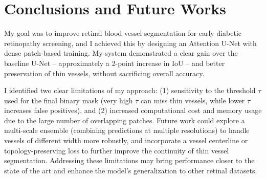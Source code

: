 \documentclass[11pt]{article}
\begin{document}
\section{Conclusions and Future Works}
My goal was to improve retinal blood vessel segmentation for early diabetic retinopathy screening, and I achieved this by designing an Attention U-Net with dense patch-based training. My system demonstrated a clear gain over the baseline U-Net – approximately a 2-point increase in IoU – and better preservation of thin vessels, without sacrificing overall accuracy.

I identified two clear limitations of my approach: (1) sensitivity to the threshold $\tau$ used for the final binary mask (very high $\tau$ can miss thin vessels, while lower $\tau$ increases false positives), and (2) increased computational cost and memory usage due to the large number of overlapping patches. Future work could explore a multi-scale ensemble (combining predictions at multiple resolutions) to handle vessels of different width more robustly, and incorporate a vessel centerline or topology-preserving loss to further improve the continuity of thin vessel segmentation. Addressing these limitations may bring performance closer to the state of the art and enhance the model’s generalization to other retinal datasets.


\bigskip


\end{document}
